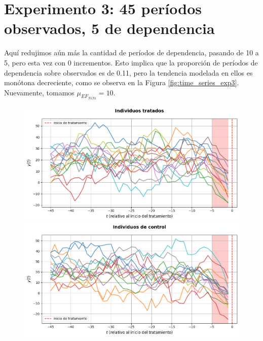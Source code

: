 \documentclass[../../main.tex]{subfiles}
\begin{document}
\section{Experimento 3: 45 períodos observados, 5 de dependencia} \label{sec:exp3} 
Aquí redujimos aún más la cantidad de períodos de dependencia, pasando de 10 a 5, pero
esta vez con 0 incrementos. Esto implica que la proporción de períodos de dependencia
sobre observados es de 0.11, pero la tendencia modelada en ellos es monótona decreciente,
como se observa en la Figura \ref{fig:time_series_exp3}. Nuevamente, tomamos
\(\mu_{{EF}_{NiNi}} = 10\).

\begin{figure}[ht]
    \centering
    \begin{minipage}{0.48\textwidth}
        \centering
        \includegraphics[scale=0.27]{figs/Exp3/tratados_sim63.png}
    \end{minipage}
    \hfill
    \begin{minipage}{0.48\textwidth}
        \centering
        \includegraphics[scale=0.27]{figs/Exp3/controles_sim63.png}
    \end{minipage}
    \vspace{0.5em}

\end{figure}
\end{document}
